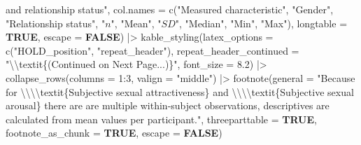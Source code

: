 \documentclass[
  bookmarksnumbered]{article}
\newenvironment{Shaded}{\begin{snugshade}}{\end{snugshade}}
\newcommand{\AttributeTok}[1]{\textcolor[rgb]{0.80,0.80,0.80}{#1}}
\newcommand{\ConstantTok}[1]{\textcolor[rgb]{0.86,0.64,0.64}{\textbf{#1}}}
\newcommand{\DecValTok}[1]{\textcolor[rgb]{0.86,0.86,0.80}{#1}}
\newcommand{\FloatTok}[1]{\textcolor[rgb]{0.75,0.75,0.82}{#1}}
\newcommand{\FunctionTok}[1]{\textcolor[rgb]{0.94,0.94,0.56}{#1}}
\newcommand{\NormalTok}[1]{\textcolor[rgb]{0.80,0.80,0.80}{#1}}
\newcommand{\SpecialCharTok}[1]{\textcolor[rgb]{0.86,0.64,0.64}{#1}}
\newcommand{\StringTok}[1]{\textcolor[rgb]{0.80,0.58,0.58}{#1}}
\begin{document}
\begin{Shaded}
\begin{Highlighting}[]
\StringTok{        and relationship status"}\NormalTok{,}
        \AttributeTok{col.names =} \FunctionTok{c}\NormalTok{(}\StringTok{"Measured characteristic"}\NormalTok{,}
                      \StringTok{"Gender"}\NormalTok{,}
                      \StringTok{"Relationship status"}\NormalTok{,}
                      \StringTok{"$n$"}\NormalTok{,}
                      \StringTok{"Mean"}\NormalTok{,}
                      \StringTok{"$SD$"}\NormalTok{,}
                      \StringTok{"Median"}\NormalTok{,}
                      \StringTok{"Min"}\NormalTok{,}
                      \StringTok{"Max"}\NormalTok{),}
        \AttributeTok{longtable =} \ConstantTok{TRUE}\NormalTok{,}
        \AttributeTok{escape =} \ConstantTok{FALSE}\NormalTok{) }\SpecialCharTok{|\textgreater{}}
  \FunctionTok{kable\_styling}\NormalTok{(}\AttributeTok{latex\_options =} \FunctionTok{c}\NormalTok{(}\StringTok{"HOLD\_position"}\NormalTok{, }\StringTok{"repeat\_header"}\NormalTok{),}
                \AttributeTok{repeat\_header\_continued =} \StringTok{"}\SpecialCharTok{\textbackslash{}\textbackslash{}}\StringTok{textit\{(Continued on Next Page...)\}"}\NormalTok{,}
                \AttributeTok{font\_size =} \FloatTok{8.2}\NormalTok{) }\SpecialCharTok{|\textgreater{}}
  \FunctionTok{collapse\_rows}\NormalTok{(}\AttributeTok{columns =} \DecValTok{1}\SpecialCharTok{:}\DecValTok{3}\NormalTok{, }\AttributeTok{valign =} \StringTok{"middle"}\NormalTok{) }\SpecialCharTok{|\textgreater{}} 
  \FunctionTok{footnote}\NormalTok{(}\AttributeTok{general =} \StringTok{"Because for }\SpecialCharTok{\textbackslash{}\textbackslash{}\textbackslash{}\textbackslash{}}\StringTok{textit\{Subjective sexual attractiveness\} and }
\StringTok{           }\SpecialCharTok{\textbackslash{}\textbackslash{}\textbackslash{}\textbackslash{}}\StringTok{textit\{Subjective sexual arousal\} there are are multiple within{-}subject }
\StringTok{           observations, descriptives are calculated from mean values per participant."}\NormalTok{,}
           \AttributeTok{threeparttable =} \ConstantTok{TRUE}\NormalTok{,}
           \AttributeTok{footnote\_as\_chunk =} \ConstantTok{TRUE}\NormalTok{,}
           \AttributeTok{escape =} \ConstantTok{FALSE}\NormalTok{)}
\end{Highlighting}
\end{Shaded}

\begingroup\fontsize{8.2}{10.2}\selectfont
\end{document}
